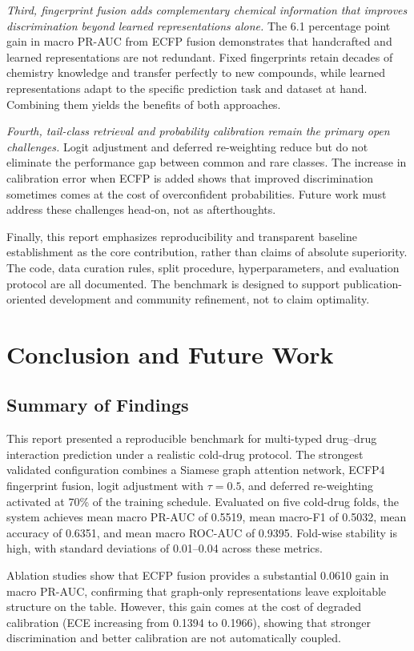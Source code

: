 \documentclass[11pt,a4paper]{report}
\begin{document}
\textit{Third, fingerprint fusion adds complementary chemical information that improves discrimination beyond learned representations alone.} The 6.1 percentage point gain in macro PR-AUC from ECFP fusion demonstrates that handcrafted and learned representations are not redundant. Fixed fingerprints retain decades of chemistry knowledge and transfer perfectly to new compounds, while learned representations adapt to the specific prediction task and dataset at hand. Combining them yields the benefits of both approaches.

\textit{Fourth, tail-class retrieval and probability calibration remain the primary open challenges.} Logit adjustment and deferred re-weighting reduce but do not eliminate the performance gap between common and rare classes. The increase in calibration error when ECFP is added shows that improved discrimination sometimes comes at the cost of overconfident probabilities. Future work must address these challenges head-on, not as afterthoughts.

Finally, this report emphasizes reproducibility and transparent baseline establishment as the core contribution, rather than claims of absolute superiority. The code, data curation rules, split procedure, hyperparameters, and evaluation protocol are all documented. The benchmark is designed to support publication-oriented development and community refinement, not to claim optimality.

\chapter{Conclusion and Future Work}
\section{Summary of Findings}
This report presented a reproducible benchmark for multi-typed drug--drug interaction prediction under a realistic cold-drug protocol. The strongest validated configuration combines a Siamese graph attention network, ECFP4 fingerprint fusion, logit adjustment with \(\tau = 0.5\), and deferred re-weighting activated at 70\% of the training schedule. Evaluated on five cold-drug folds, the system achieves mean macro PR-AUC of 0.5519, mean macro-F1 of 0.5032, mean accuracy of 0.6351, and mean macro ROC-AUC of 0.9395. Fold-wise stability is high, with standard deviations of 0.01--0.04 across these metrics.

Ablation studies show that ECFP fusion provides a substantial 0.0610 gain in macro PR-AUC, confirming that graph-only representations leave exploitable structure on the table. However, this gain comes at the cost of degraded calibration (ECE increasing from 0.1394 to 0.1966), showing that stronger discrimination and better calibration are not automatically coupled.
\end{document}

